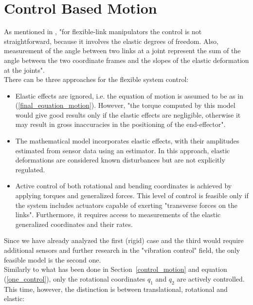 \documentclass[a4paper,12pt,oneside]{report}
\begin{document}
\section{Control Based Motion}
As mentioned in \cite{thirteen}, "for flexible-link manipulators the control is not straightforward, because it involves the elastic degrees of freedom. Also, measurement of the angle between two links at a joint represent the sum of the angle between the two coordinate frames and the slopes of the elastic deformation at the joints".\\
There can be three approaches for the flexible system control\cite{thirteen}:
\begin{itemize}
  \item Elastic effects are ignored, i.e. the equation of motion is assumed to be as in (\ref{final_equation_motion}). However, "the torque computed by this model would give good results only if the elastic effects are negligible, otherwise it may result in gross inaccuracies in the positioning of the end-effector".
  \item The mathematical model incorporates elastic effects, with their amplitudes estimated from sensor data using an estimator. In this approach, elastic deformations are considered known disturbances but are not explicitly regulated.
  \item Active control of both rotational and bending coordinates is achieved by applying torques and generalized forces. This level of control is feasible only if the system includes actuators capable of exerting "transverse forces on the links"\cite{thirteen}. Furthermore, it requires access to measurements of the elastic generalized coordinates and their rates.
\end{itemize}
Since we have already analyzed the first (rigid) case and the third would require additional sensors and further research in the "vibration control" field, the only feasible model is the second one.\\
Similarly to what has been done in Section~\ref{control_motion} and equation (\ref{one_control}), only the rotational coordinates $q_1$ and $q_2$ are actively controlled. This time, however, the distinction is between translational, rotational and elastic:
\end{document}
